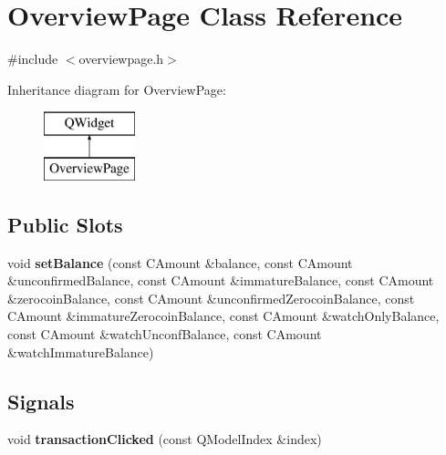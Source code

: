 \hypertarget{class_overview_page}{}\section{Overview\+Page Class Reference}
\label{class_overview_page}


{\ttfamily \#include $<$overviewpage.\+h$>$}

Inheritance diagram for Overview\+Page\+:\begin{figure}[H]
\begin{center}
\leavevmode
\includegraphics[height=2.000000cm]{class_overview_page}
\end{center}
\end{figure}
\subsection*{Public Slots}
\begin{DoxyCompactItemize}
\item 
\mbox{\label{class_overview_page_a93fac198949a3e71a92a3f67ee5753a1}} 
void {\bfseries set\+Balance} (const C\+Amount \&balance, const C\+Amount \&unconfirmed\+Balance, const C\+Amount \&immature\+Balance, const C\+Amount \&zerocoin\+Balance, const C\+Amount \&unconfirmed\+Zerocoin\+Balance, const C\+Amount \&immature\+Zerocoin\+Balance, const C\+Amount \&watch\+Only\+Balance, const C\+Amount \&watch\+Unconf\+Balance, const C\+Amount \&watch\+Immature\+Balance)
\end{DoxyCompactItemize}
\subsection*{Signals}
\begin{DoxyCompactItemize}
\item 
\mbox{\label{class_overview_page_aa75e17f571b13dfcdd6f5251cbfe966d}} 
void {\bfseries transaction\+Clicked} (const Q\+Model\+Index \&index)
\end{DoxyCompactItemize}
